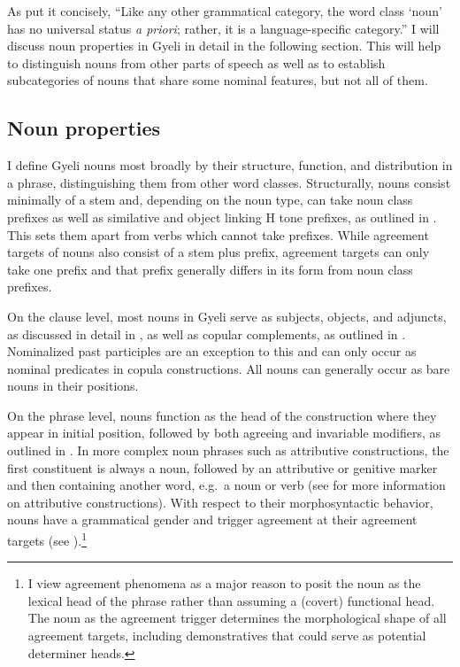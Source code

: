 As \citet[733]{lehmann2000}  put it concisely, ``Like any other grammatical category, the word class `noun' has no universal status {\itshape a priori}; rather, it is a language-specific category.'' I will discuss noun properties in Gyeli in detail in the following section. This will help to distinguish nouns from other parts of speech as well as to establish subcategories of nouns that share some nominal features, but not all of them.


\subsection{Noun properties}
\label{sec:Nprop}

I define Gyeli nouns most broadly by their structure, function, and distribution in a phrase, distinguishing them from other word classes. Structurally, nouns consist minimally of a stem and, depending on the noun type, can take noun class prefixes as well as similative and object linking H tone prefixes, as outlined in . This sets them apart from verbs which cannot take prefixes. While agreement targets of nouns also consist of a stem plus prefix, agreement targets can only take one prefix and that prefix generally differs in its form from noun class prefixes.

On the clause level, most nouns in Gyeli serve as subjects, objects, and adjuncts, as discussed in detail in , as well as copular complements, as outlined in . Nominalized past participles are an exception to this and can only occur as nominal predicates in copula constructions. All nouns can generally occur as bare nouns in their positions.

On the phrase level, nouns function as the head of the construction where they appear in initial position, followed by both agreeing and invariable modifiers, as outlined in . In more complex noun phrases such as attributive constructions, the first constituent is always a noun, followed by an attributive or genitive marker and then containing another word, e.g.\ a noun or verb (see  for more information on attributive constructions).
With respect to their morphosyntactic behavior, nouns have a grammatical gender and trigger agreement at their agreement targets (see ).\footnote{I view agreement phenomena as a major reason to posit the noun as the lexical head of the phrase rather than assuming a (covert) functional head. The noun as the agreement trigger determines the morphological shape of all agreement targets, including demonstratives that could serve as potential determiner heads.}


